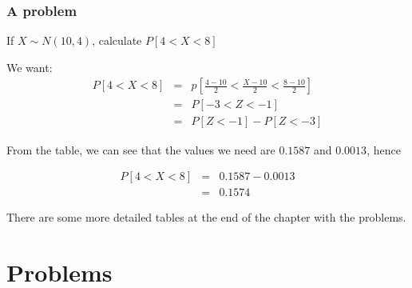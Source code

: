 \documentclass[12pt]{extbook}
\begin{document}
\newpage
\subsubsection{A problem}

If $X \sim N(10,4)$, calculate $P[4 < X < 8]$

We want:
\begin{eqnarray*}
P[4 < X < 8] &=& p \left[ \frac{4-10}{2} < \frac{X-10}{2} < \frac{8-10}{2} \right]\\
&=& P[-3 < Z < -1]\\
&=& P[Z < -1] - P[Z < -3]
\end{eqnarray*}

From the table, we can see that the values we need are $0.1587$ and $0.0013$, hence

\begin{eqnarray*}
P[4 < X < 8] &=& 0.1587-0.0013\\
 &=& 0.1574
\end{eqnarray*}

There are some more detailed tables at the end of the chapter with the problems.

\section{Problems}

\begin{enumerate}

















\end{enumerate}
\end{document}
